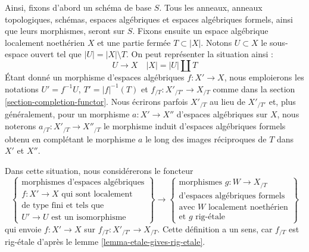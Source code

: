\medskip\noindent
Ainsi, fixons d'abord un schéma de base $S$. Tous les anneaux, anneaux
topologiques, schémas, espaces algébriques et espaces algébriques formels,
ainsi que leurs morphismes, seront sur $S$. Fixons ensuite un espace
algébrique localement noethérien $X$ et une partie fermée $T \subset |X|$.
Notons $U \subset X$ le sous-espace ouvert tel que $|U| = |X| \setminus T$.
On peut représenter la situation ainsi :
$$
U \to X \quad |X| = |U| \amalg T
$$
Étant donné un morphisme d'espaces algébriques $f : X' \to X$, nous
emploierons les notations $U' = f^{-1}U$, $T' = |f|^{-1}(T)$ et
$f_{/T} : X'_{/T'} \to X_{/T}$ comme dans la
section \ref{section-completion-functor}. Nous écrirons parfois
$X'_{/T}$ au lieu de $X'_{/T'}$ et, plus généralement, pour un morphisme
$a : X' \to X''$ d'espaces algébriques sur $X$, nous noterons
$a_{/T} : X'_{/T} \to X''_{/T}$ le morphisme induit d'espaces algébriques
formels obtenu en complétant le morphisme $a$ le long des images réciproques
de $T$ dans $X'$ et $X''$.

\medskip\noindent
Dans cette situation, nous considérerons le foncteur
\begin{equation}
\label{equation-completion-functor}
\left\{
\begin{matrix}
\text{morphismes d'espaces algébriques}\\
f : X' \to X\text{ qui sont localement}\\
\text{de type fini et tels que}\\
U' \to U\text{ est un isomorphisme}
\end{matrix}
\right\}
\longrightarrow
\left\{
\begin{matrix}
\text{morphismes }g : W \to X_{/T}\\
\text{d'espaces algébriques formels}\\
\text{avec }W\text{ localement noethérien}\\
\text{et }g\text{ rig-étale}
\end{matrix}
\right\}
\end{equation}
qui envoie $f : X' \to X$ sur $f_{/T} : X'_{/T'} \to X_{/T}$.
Cette définition a un sens, car $f_{/T}$ est rig-étale d'après le
lemme \ref{lemma-etale-gives-rig-etale}.

